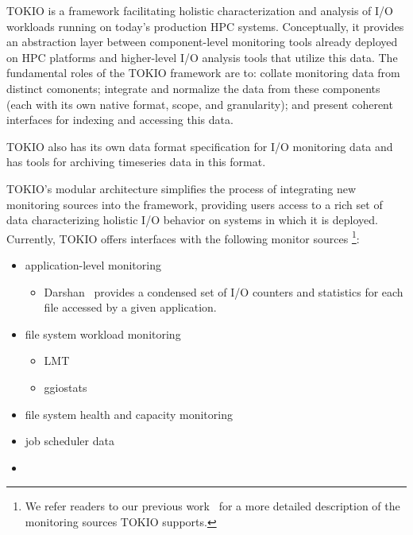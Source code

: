 
TOKIO is a framework facilitating holistic characterization and analysis of I/O workloads running on today's production HPC systems. Conceptually, it provides an abstraction layer between component-level monitoring tools already deployed on HPC platforms and higher-level I/O analysis tools that utilize this data. The fundamental roles of the TOKIO framework are to: collate monitoring data from distinct comonents; integrate and normalize the data from these components (each with its own native format, scope, and granularity); and present coherent interfaces for indexing and accessing this data.

TOKIO also has its own data format specification for I/O monitoring data and has tools for archiving timeseries data in this format.

TOKIO's modular architecture simplifies the process of integrating new monitoring sources into the framework, providing users access to a rich set of data characterizing holistic I/O behavior on systems in which it is deployed. Currently, TOKIO offers interfaces with the following monitor sources \footnote{We refer readers to our previous work~\cite{Lockwood2017, Lockwood2018tokio} for a more detailed description of the monitoring sources TOKIO supports.}:

\begin{itemize}
\item application-level monitoring
  \begin{itemize}
  \item Darshan~\cite{Carns2009} provides a condensed set of I/O counters and statistics for each file accessed by a given application. 
  \end{itemize}
\item file system workload monitoring
  \begin{itemize}
  \item LMT
  \item ggiostats
  \end{itemize}
\item file system health and capacity monitoring
\item job scheduler data
\item {}
\end{itemize}

